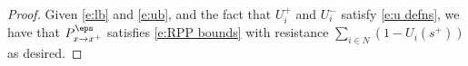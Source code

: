 \begin{proof}
%

Given \eqref{e:lb} and \eqref{e:ub}, and the fact that $U_i^+$ and $U_i^-$ satisfy \eqref{e:u defns}, we have that $P_{x\to x^+}^\eps$ satisfies \eqref{e:RPP bounds} with resistance $\sum_{i\in N}\left(1 - U_i(s^+)\right)$ as desired.
\end{proof}



